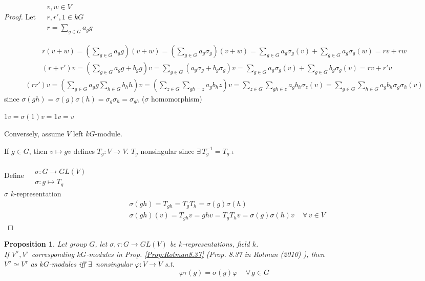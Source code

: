 \documentclass[10pt]{amsart}
\newtheorem{proposition}{Proposition}
\begin{document}
\begin{multicols*}{2}
\begin{proof}
	Let $\begin{aligned} & \quad \\ 
	& v,w \in V \\
	& r,r',1 \in kG \\
	& r = \sum_{g\in G} a_g g \end{aligned}$
	
	\[
	\begin{gathered}
	r(v+w) = \left( \sum_{g\in G} a_g g \right)(v+w) = \left( \sum_{g \in G} a_g \sigma_g \right)(v+w) = \sum_{g\in G} a_g \sigma_g(v) + \sum_{g\in G} a_g \sigma_g(w) = rv + rw \\ 
	(r+r')v = \left( \sum_{g\in G} a_g g + b_g g \right) v =\sum_{g\in G} (a_g \sigma_g + b_g \sigma_g ) v = \sum_{g \in G}a_g \sigma_g(v) + \sum_{g\in G}b_g \sigma_g(v) = rv + r'v 
	\end{gathered}
	\]
	\[
	\begin{gathered}
	(rr')v = \left( \sum_{g\in G} a_g g \sum_{h \in G} b_h h \right)v = \left( \sum_{z\in G} \sum_{gh = z} a_g b_h z \right) v = \sum_{z\in G} \sum_{gh \in z} a_g b_h \sigma_z(v) = \sum_{g\in G} \sum_{h \in G} a_g b_h \sigma_g \sigma_h (v)
	\end{gathered}
	\]
	since $\sigma(gh) = \sigma(g) \sigma(h) = \sigma_g \sigma_h = \sigma_{gh}$ ($\sigma$ homomorphism)
	
	$1v = \sigma(1) v = 1v = v$
	
	Conversely, assume $V$ left $kG$-module.
	
	If $g \in G$, then $v\mapsto gv$ defines $T_g:V \to V$.  $T_g$ nonsingular since $\exists \, T_g^{-1} = T_{g^{-1}}$
	
	Define $\begin{aligned} & \quad \\
	& \sigma : G \to GL(V) \\
	& \sigma: g \mapsto T_g \end{aligned}$ \quad \\
	
	$\sigma$ $k$-representation
	\[
	\begin{aligned}
	& \sigma(gh) = T_{gh} = T_g T_h = \sigma(g)\sigma(h) \\
	& \sigma(gh)(v) = T_{gh}v = ghv = T_gT_h v = \sigma(g)\sigma(h)v \quad \, \forall \, v \in V
	\end{aligned}
	\]
	
\end{proof}

\begin{proposition}
	Let group $G$, let $\sigma, \tau: G \to GL(V)$ be $k$-representations, field $k$.  \\
	If $V^{\sigma}, V^{\tau}$ corresponding $kG$-modules in Prop. \ref{Prop:Rotman8.37} (Prop. 8.37 in Rotman (2010) \cite{JRotman2010}), then \\
	$V^{\sigma} \simeq V^{\tau}$ as $kG$-modules iff $\exists \, $ nonsingular $\varphi :V \to V$ s.t. 
	\[
	\varphi \tau(g) = \sigma(g) \varphi \quad \, \forall \, g \in G
	\]
	

\end{proposition}
\end{multicols*}
\end{document}
